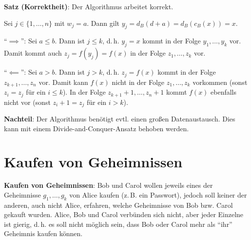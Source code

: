 \linie

\textbf{Satz (Korrektheit)}:
Der Algorithmus arbeitet korrekt.

\begin{Beweis}
    Sei $j \in \{1, \dotsc, n\}$ mit $w_j = a$.
    Dann gilt $y_j = d_B(d + a) = d_B(c_B(x)) = x$.

    "`$\implies$"':
    Sei $a \le b$.
    Dann ist $j \le k$, d.\,h. $y_j = x$ kommt in der Folge $y_1, \dotsc, y_k$ vor.
    Damit kommt auch $z_j = f(y_j) = f(x)$ in der Folge $z_1, \dotsc, z_k$ vor.

    "`$\impliedby$"':
    Sei $a > b$.
    Dann ist $j > k$, d.\,h. $z_j = f(x)$ kommt in der Folge $z_{k+1}, \dotsc, z_n$ vor.
    Damit kann $f(x)$ nicht in der Folge $z_1, \dotsc, z_k$ vorkommen
    (sonst $z_i = z_j$ für ein $i \le k$).
    In der Folge $z_{k+1} + 1, \dotsc, z_n + 1$ kommt $f(x)$ ebenfalls nicht vor
    (sonst $z_i + 1 = z_j$ für ein $i > k$).
\end{Beweis}

\linie

\textbf{Nachteil}:
Der Algorithmus benötigt evtl. einen großen Datenaustausch.
Dies kann mit einem Divide-and-Conquer-Ansatz behoben werden.

\pagebreak

\section{%
    Kaufen von Geheimnissen%
}

\textbf{Kaufen von Geheimnissen}:
Bob und Carol wollen jeweils eines der Geheimnisse $g_1, \dotsc, g_k$ von Alice kaufen
(z.\,B. ein Passwort),
jedoch soll keiner der anderen, auch nicht Alice, erfahren, welche Geheimnisse von
Bob bzw. Carol gekauft wurden.
Alice, Bob und Carol verbünden sich nicht,
aber jeder Einzelne ist gierig, d.\,h. es soll nicht möglich sein, dass Bob oder Carol mehr
als "`ihr"' Geheimnis kaufen können.

